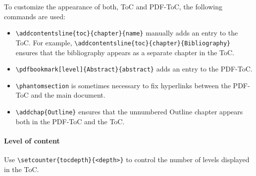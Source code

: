 To customize the appearance of both, ToC and PDF-ToC, the following commands are used:
\begin{itemize}
	\item \verb|\addcontentsline{toc}{chapter}{name}|  manually adds an entry to the ToC.  For example, \verb|\addcontentsline{toc}{chapter}{Bibliography}| ensures that the bibliography appears as a separate chapter in the ToC.
	\item \verb|\pdfbookmark[level]{Abstract}{abstract}| adds an entry to the PDF-ToC.
	\item \verb|\phantomsection| is sometimes necessary to fix hyperlinks between the PDF-ToC and the main document.
	\item \verb|\addchap{Outline}| ensures that the unnumbered Outline chapter appears both in the PDF-ToC and the ToC.
\end{itemize} 

\paragraph{Level of content}
Use \verb|\setcounter{tocdepth}{<depth>}| to control the number of levels displayed in the ToC.

